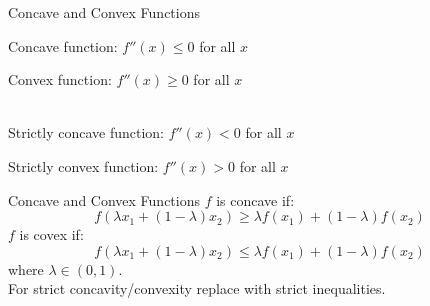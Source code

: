 \documentclass{./../../Latex/teaching_slides}
\begin{document}
\begin{frame}{Concave and Convex Functions}
\begin{witemize}
  \item Concave function: $ f''(x) \leq 0$ for all $x$ 
  \item Convex function: $ f''(x) \geq 0$ for all $x$ \\~\\
  \item Strictly concave function: $ f''(x) < 0$ for all $x$ 
  \item Strictly convex function: $ f''(x) > 0$ for all $x$ 
\end{witemize}
\end{frame}

\begin{frame}{Concave and Convex Functions}
$f$ is concave if:
$$ f(\lambda x_1 + (1-\lambda) x_2) \geq \lambda f(x_1) + (1-\lambda) f(x_2)  $$
$f$ is covex if:
$$ f(\lambda x_1 + (1-\lambda) x_2) \leq \lambda f(x_1) + (1-\lambda) f(x_2)  $$
where $\lambda \in (0,1)$.\\
\vspace{1em}
For strict concavity/convexity replace with strict inequalities. 
\end{frame}
\end{document}
